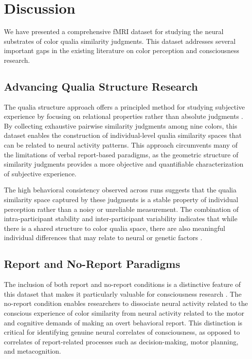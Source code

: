 \documentclass[11pt]{article}
\begin{document}
\section{Discussion}

We have presented a comprehensive fMRI dataset for studying the neural substrates of color qualia similarity judgments. This dataset addresses several important gaps in the existing literature on color perception and consciousness research.

\subsection{Advancing Qualia Structure Research}

The qualia structure approach offers a principled method for studying subjective experience by focusing on relational properties rather than absolute judgments \citep{edelman1998representation}. By collecting exhaustive pairwise similarity judgments among nine colors, this dataset enables the construction of individual-level qualia similarity spaces that can be related to neural activity patterns. This approach circumvents many of the limitations of verbal report-based paradigms, as the geometric structure of similarity judgments provides a more objective and quantifiable characterization of subjective experience.

The high behavioral consistency observed across runs suggests that the qualia similarity space captured by these judgments is a stable property of individual perception rather than a noisy or unreliable measurement. The combination of intra-participant stability and inter-participant variability indicates that while there is a shared structure to color qualia space, there are also meaningful individual differences that may relate to neural or genetic factors \citep{neitz2011color}.

\subsection{Report and No-Report Paradigms}

The inclusion of both report and no-report conditions is a distinctive feature of this dataset that makes it particularly valuable for consciousness research \citep{tsuchiya2015no}. The no-report condition enables researchers to dissociate neural activity related to the conscious experience of color similarity from neural activity related to the motor and cognitive demands of making an overt behavioral report. This distinction is critical for identifying genuine neural correlates of consciousness, as opposed to correlates of report-related processes such as decision-making, motor planning, and metacognition.
\end{document}
